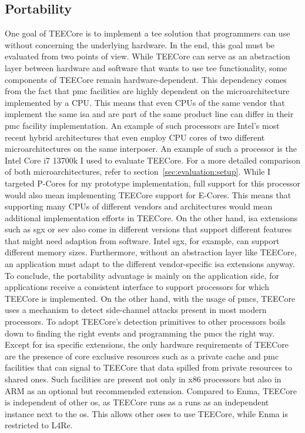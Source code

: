 \subsection{Portability}
\label{eval:compare:portability}
One goal of TEECore is to implement a \gls{tee} solution that programmers can
use without concerning the underlying hardware. In the end, this goal must be
evaluated from two points of view. While TEECore can serve as an abstraction
layer between hardware and software that wants to use \gls{tee} functionality,
some components of TEECore remain hardware-dependent. This dependency comes from
the fact that \gls{pmc} facilities are highly dependent on the microarchitecture
implemented by a CPU. This means that even CPUs of the same vendor that
implement the same \gls{isa} and are part of the same product line can differ in
their \gls{pmc} facility implementation. An example of such processors are
Intel's most recent hybrid architectures that even employ CPU cores of two
different microarchitectures on the same interposer. An example of such a
processor is the Intel Core i7 13700k I used to evaluate TEECore. For a more
detailed comparison of both microarchitectures, refer to
section~\ref{sec:evaluation:setup}. While I targeted P-Cores for my prototype
implementation, full support for this processor would also mean implementing
TEECore support for E-Cores. This means that supporting many CPUs of different
vendors and architectures would mean additional implementation efforts in
TEECore. On the other hand, \gls{isa} extensions such as \gls{sgx} or \gls{sev}
also come in different versions that support different features that might need
adaption from software. Intel \gls{sgx}, for example, can support different
memory sizes. Furthermore, without an abstraction layer like TEECore, an
application must adapt to the different vendor-specific \gls{isa} extensions
anyway. To conclude, the portability advantage is mainly on the application
side, for applications receive a consistent interface to support processors for
which TEECore is implemented. On the other hand, with the usage of \glspl{pmc},
TEECore uses a mechanism to detect side-channel attacks present in most modern
processors. To adopt TEECore's detection primitives to other processors boils
down to finding the right events and programming the \glspl{pmc} the right way.
Except for \gls{isa} specific extensions, the only hardware requirements of
TEECore are the presence of core exclusive resources such as a private cache and
\gls{pmc} facilities that can signal to TEECore that data spilled from private
resources to shared ones. Such facilities are present not only in x86 processors
but also in ARM as an optional but recommended extension. Compared to Enma,
TEECore is independent of other \gls{os}, as TEECore runs as a runs as
an independent instance next to the \gls{os}. This allows other \gls{os}es to
use TEECore, while Enma is restricted to L4Re.

